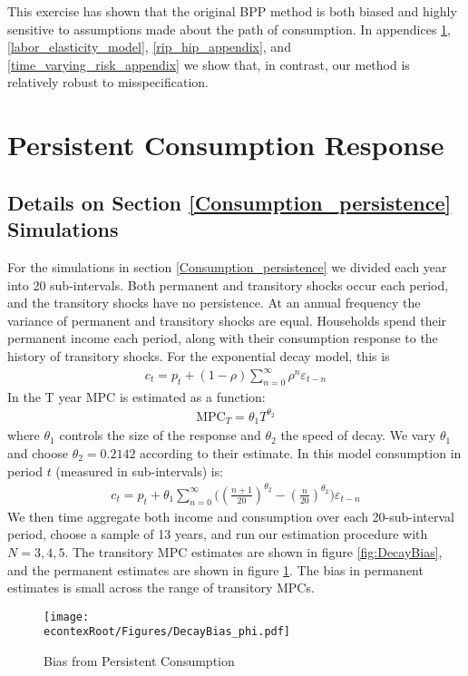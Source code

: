 \documentclass[titlepage]{\econtex}\newcommand{\texname}{ConsumptionHeterogeneity}
\begin{document}
This exercise has shown that the original BPP method is both biased and highly sensitive to assumptions made about the path of consumption. In appendices \ref{consumption_persistence_appendix}, \ref{labor_elasticity_model}, \ref{rip_hip_appendix}, and \ref{time_varying_risk_appendix} we show that, in contrast, our method is relatively robust to misspecification.

\section{Persistent Consumption Response} \label{consumption_persistence_appendix}
\setcounter{figure}{0}   
\setcounter{table}{0} 
\subsection{Details on Section \ref{Consumption_persistence} Simulations}
For the simulations in section \ref{Consumption_persistence} we divided each year into 20 sub-intervals. Both permanent and transitory shocks occur each period, and the transitory shocks have no persistence. At an annual frequency the variance of permanent and transitory shocks are equal. Households spend their permanent income each period, along with their consumption response to the history of transitory shocks. For the exponential decay model, this is
\begin{align*}
c_t = p_t + (1-\rho)\sum_{n=0}^{\infty}\rho^n \varepsilon_{t-n}
\end{align*}
In \cite{fagereng_mpc_2016} the T year MPC is estimated as a function:
\begin{align*}
\text{MPC}_T = \theta_1 T^{\theta_2}
\end{align*}
where $\theta_1$ controls the size of the response and $\theta_2$ the speed of decay. We vary $\theta_1$ and choose $\theta_2= 0.2142$ according to their estimate. In this model consumption in period $t$ (measured in sub-intervals) is:
\begin{align*}
c_t = p_t + \theta_1\sum_{n=0}^{\infty}\Big( (\frac{n+1}{20})^{\theta_2} -(\frac{n}{20})^{\theta_2} \Big)\varepsilon_{t-n}
\end{align*}
We then time aggregate both income and consumption over each 20-sub-interval period, choose a sample of 13 years, and run our estimation procedure with $N=3,4,5$. The transitory MPC estimates are shown in figure \ref{fig:DecayBias}, and the permanent estimates are shown in figure \ref{fig:DecayBias_phi}. The bias in permanent estimates is small across the range of transitory MPCs.
\begin{figure} 
	\begin{centering}
		\texttt{[image: \\econtexRoot/Figures/DecayBias\_phi.pdf]}
		\caption{Bias from Persistent Consumption}
		\label{fig:DecayBias_phi}
	\end{centering}
\end{figure}
\end{document}
